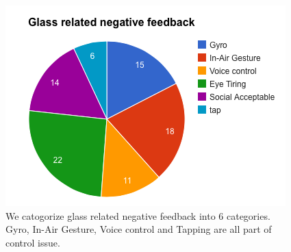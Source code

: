 \begin{figure}[!t]
\centering
\includegraphics[width=0.9\columnwidth]{Figures/US1_userfeedbackStatistics.png}
\caption{We catogorize glass related negative feedback into 6 categories. Gyro, In-Air Gesture, Voice control and Tapping are all part of control issue.}
\label{fig:negativeFeedback}
\end{figure}




